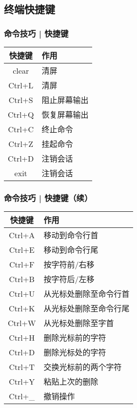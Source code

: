 \subsection{终端快捷键}
\begin{frame}
  \frametitle{命令技巧 | 快捷键}
  \begin{table}
    \centering
    \begin{tabularx}{0.4\textwidth}{cX}
      \hline
      \rowcolor{blue!50}快捷键 & 作用\\
      \hline
      clear & 清屏\\
      \alert{Ctrl+L} & 清屏\\
      \hline
      Ctrl+S & 阻止屏幕输出\\
      Ctrl+Q & 恢复屏幕输出\\
      \hline
      \alert{Ctrl+C} & 终止命令\\
      \alert{Ctrl+Z} & 挂起命令\\
      \hline
      \alert{Ctrl+D} & 注销会话\\
      exit & 注销会话\\
      \hline
    \end{tabularx}
  \end{table}
\end{frame}

\begin{frame}
  \frametitle{命令技巧 | 快捷键（续）}
  \begin{table}
    \centering
    \begin{tabularx}{0.6\textwidth}{cX}
      \hline
      \rowcolor{blue!50}快捷键 & 作用\\
      \hline
      Ctrl+A & 移动到命令行首\\
      Ctrl+E & 移动到命令行尾\\
      Ctrl+F & 按字符前/右移\\
      Ctrl+B & 按字符后/左移\\
      \hline
      Ctrl+U & 从光标处删除至命令行首\\
      Ctrl+K & 从光标处删除至命令行尾\\
      Ctrl+W & 从光标处删除至字首\\
      Ctrl+H & 删除光标前的字符\\
      Ctrl+D & 删除光标处的字符\\
      Ctrl+T & 交换光标前的两个字符\\
      Ctrl+Y & 粘贴上次的删除\\
      Ctrl+\_ & 撤销操作\\
      \hline
    \end{tabularx}
  \end{table}
\end{frame}

